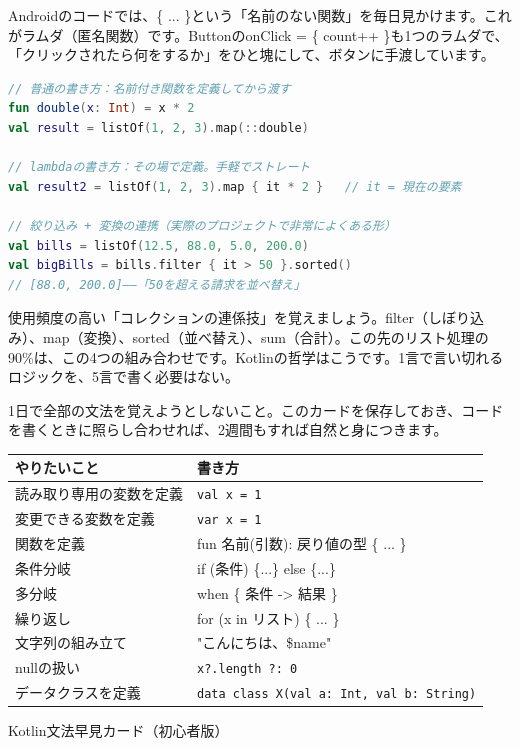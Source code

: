 
Androidのコードでは、\{ ... \}という「名前のない関数」を毎日見かけます。これがラムダ（匿名関数）です。ButtonのonClick = \{ count++ \}も1つのラムダで、「クリックされたら何をするか」をひと塊にして、ボタンに手渡しています。

\begin{lstlisting}[language=Kotlin]
// 普通の書き方：名前付き関数を定義してから渡す
fun double(x: Int) = x * 2
val result = listOf(1, 2, 3).map(::double)

// lambdaの書き方：その場で定義。手軽でストレート
val result2 = listOf(1, 2, 3).map { it * 2 }   // it = 現在の要素

// 絞り込み + 変換の連携（実際のプロジェクトで非常によくある形）
val bills = listOf(12.5, 88.0, 5.0, 200.0)
val bigBills = bills.filter { it > 50 }.sorted()
// [88.0, 200.0]——「50を超える請求を並べ替え」
\end{lstlisting}

使用頻度の高い「コレクションの連係技」を覚えましょう。filter（しぼり込み）、map（変換）、sorted（並べ替え）、sum（合計）。この先のリスト処理の90\%は、この4つの組み合わせです。Kotlinの哲学はこうです。1言で言い切れるロジックを、5言で書く必要はない。


1日で全部の文法を覚えようとしないこと。このカードを保存しておき、コードを書くときに照らし合わせれば、2週間もすれば自然と身につきます。

\begin{center}
\begin{tabularx}{\linewidth}{|X|X|}
\hline
\textbf{やりたいこと} & \textbf{書き方} \tabularnewline
\hline
読み取り専用の変数を定義 & \texttt{val x = 1} \tabularnewline
変更できる変数を定義 & \texttt{var x = 1} \tabularnewline
関数を定義 & fun 名前(引数): 戻り値の型 \{ ... \} \tabularnewline
条件分岐 & if (条件) \{...\} else \{...\} \tabularnewline
多分岐 & when \{ 条件 -> 結果 \} \tabularnewline
繰り返し & for (x in リスト) \{ ... \} \tabularnewline
文字列の組み立て & "こんにちは、\$name" \tabularnewline
nullの扱い & \texttt{x?.\allowbreak length ?: 0} \tabularnewline
データクラスを定義 & \texttt{data class X(val a: Int, val b: String)} \tabularnewline
\hline
\end{tabularx}
\end{center}

\begin{center}\small\color{gray}Kotlin文法早見カード（初心者版）\end{center}

